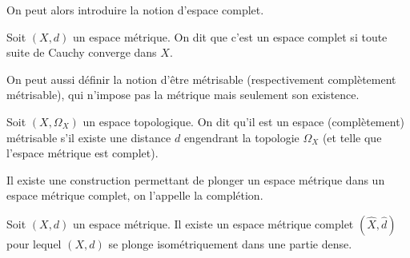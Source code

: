 On peut alors introduire la notion d'espace complet.

\begin{definition}
  Soit $(X,d)$ un espace métrique. On dit que c'est un espace complet si toute
  suite de Cauchy converge dans $X$.
\end{definition}

On peut aussi définir la notion d'être métrisable (respectivement complètement
métrisable), qui n'impose pas la métrique mais seulement son existence.

\begin{definition}
  Soit $(X,\Omega_X)$ un espace topologique. On dit qu'il est un espace
  (complètement) métrisable s'il existe une distance $d$ engendrant la topologie
  $\Omega_X$ (et telle que l'espace métrique est complet).
\end{definition}

Il existe une construction permettant de plonger un espace métrique dans un
espace métrique complet, on l'appelle la complétion.

\begin{proposition}
  Soit $(X,d)$ un espace métrique. Il existe un espace métrique complet
  $(\hat X,\hat d)$ pour lequel $(X,d)$ se plonge isométriquement dans une
  partie dense.
\end{proposition}

